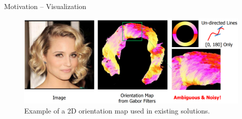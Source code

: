 \begin{frame}{Motivation -- Visualization}
    \begin{figure}
        \centering
        \includegraphics[width=0.9\linewidth]{assets/figures/motivations/orientation-map.png}
        \caption{Example of a 2D orientation map used in existing solutions.}
        \label{fig:motivation-orientation-map}
    \end{figure}
\end{frame}
